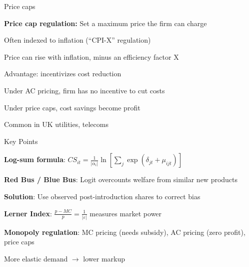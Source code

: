 \documentclass[notes,11pt, aspectratio=169]{beamer}
\newenvironment{wideitemize}{\itemize\addtolength{\itemsep}{10pt}}{\enditemize}
\newenvironment{wideenumerate}{\enumerate\addtolength{\itemsep}{10pt}}{\endenumerate}
\begin{document}
\begin{frame}{Price caps}
	\begin{wideitemize}
		\item \textbf{Price cap regulation:} Set a maximum price the firm can charge
		\item Often indexed to inflation (``CPI-X'' regulation)
		\begin{wideitemize}
			\vspace{5pt}
			\item Price can rise with inflation, minus an efficiency factor X
		\end{wideitemize}
		\item Advantage: incentivizes cost reduction
		\begin{wideitemize}
			\vspace{5pt}
			\item Under AC pricing, firm has no incentive to cut costs
			\item Under price caps, cost savings become profit
		\end{wideitemize}
		\item Common in UK utilities, telecoms
	\end{wideitemize}
\end{frame}



\begin{frame}{Key Points}
	\vspace{11pt}
	\begin{wideenumerate}
		\item \textbf{Log-sum formula}: $CS_{it} = \frac{1}{|\alpha_i|}\ln\left[\sum_j \exp(\delta_{jt} + \mu_{ijt})\right]$
		\item \textbf{Red Bus / Blue Bus}: Logit overcounts welfare from similar new products
		\item \textbf{Solution}: Use observed post-introduction shares to correct bias
		\item \textbf{Lerner Index}: $\frac{p - MC}{p} = \frac{1}{|\varepsilon|}$ measures market power
		\item \textbf{Monopoly regulation}: MC pricing (needs subsidy), AC pricing (zero profit), price caps
		\item More elastic demand $\rightarrow$ lower markup
	\end{wideenumerate}
\end{frame}
\end{document}
